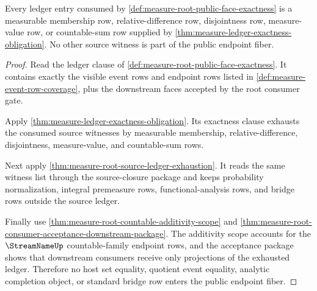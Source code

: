 \begin{theorem}
\label{thm:measure-root-public-face-ledger-exhaustion}
Every ledger entry consumed by
\autoref{def:measure-root-public-face-exactness} is a measurable membership
row, relative-difference row, disjointness row, measure-value row, or
countable-sum row supplied by
\autoref{thm:measure-ledger-exactness-obligation}. No other source witness is
part of the public endpoint fiber.
\end{theorem}
\begin{proof}
Read the ledger clause of
\autoref{def:measure-root-public-face-exactness}. It contains exactly the
visible event rows and endpoint rows listed in
\autoref{def:measure-event-row-coverage}, plus the downstream faces accepted
by the root consumer gate.

Apply \autoref{thm:measure-ledger-exactness-obligation}. Its exactness clause
exhausts the consumed source witnesses by measurable membership,
relative-difference, disjointness, measure-value, and countable-sum rows.

Next apply \autoref{thm:measure-root-source-ledger-exhaustion}. It reads the
same witness list through the source-closure package and keeps probability
normalization, integral premeasure rows, functional-analysis rows, and bridge
rows outside the source ledger.

Finally use \autoref{thm:measure-root-countable-additivity-scope} and
\autoref{thm:measure-root-consumer-acceptance-downstream-package}. The
additivity scope accounts for the $\StreamNameUp$ countable-family endpoint
rows, and the acceptance package shows that downstream consumers receive only
projections of the exhausted ledger. Therefore no host set equality, quotient
event equality, analytic completion object, or standard bridge row enters the
public endpoint fiber.
\end{proof}

